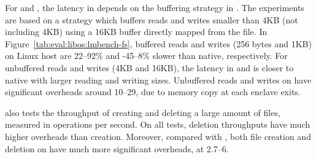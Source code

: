 For  and ,
the latency in \graphene{} depends on the buffering strategy in \thelibos{}.
The experiments
are based on a strategy which
buffers reads and writes smaller than 4KB (not including 4KB)
using a 16KB buffer directly mapped from the file.
In Figure~\ref{tab:eval:libos:lmbench-fs}, buffered reads and writes (256 bytes and 1KB) on Linux host
are 22--92\% and -45--8\% slower than native, respectively.
For unbuffered reads and writes (4KB and 16KB),
the latency in \graphene{} and \graphenesgx{}
is closer to native with larger reading and writing sizes.
Unbuffered reads and writes
on \graphenesgx{}
have significant overheads around 10--29\x{}, due to memory
copy at each enclave exits.

\lmbench{} also tests the throughput of creating and deleting a large amount of files,
measured in operations per second.
On all tests, deletion throughputs have much higher overheads than creation. Moreover, compared with \graphene{}, 
both file creation and deletion on \graphenesgx{} have much more significant overheads,
at 2.7--6\x{}.


